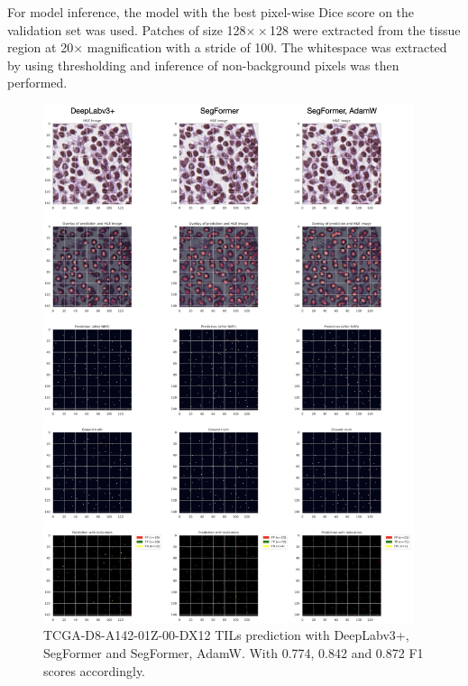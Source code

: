 For model inference, the model with the best pixel-wise Dice score on the validation set was used.
Patches of size 128$×\times$128 were extracted from the tissue region at 20$\times$ magnification
with a stride of 100. The whitespace was extracted by using thresholding and
inference of non-background pixels was then performed.

\begin{figure}[H]
    \centering
    \includegraphics[width=0.97\textwidth]{figures/tils/TCGA-D8-A142-01Z-00-DX12_2.png}
    \caption{TCGA-D8-A142-01Z-00-DX12 TILs prediction with DeepLabv3+, SegFormer and
    SegFormer, AdamW. With 0.774, 0.842 and 0.872 F1 scores accordingly.}
    \label{fig:TCGA-D8-A142_tils}
\end{figure}

